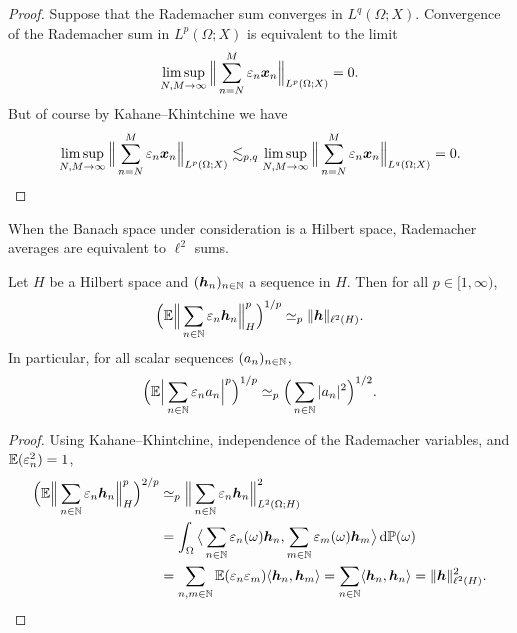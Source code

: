 \begin{proof}
  Suppose that the Rademacher sum converges in $L^q(\Omega;X)$.
  Convergence of the Rademacher sum in $L^p(\Omega;X)$ is equivalent to the limit
  \begin{equation*}
    \limsup_{N,M \to \infty} \Big\| \sum_{n=N}^{M} \varepsilon_{n} \bm{x}_{n} \Big\|_{L^p(\Omega;X)} = 0.
  \end{equation*}
  But of course by Kahane--Khintchine we have
  \begin{equation*}
    \limsup_{N,M \to \infty} \Big\| \sum_{n=N}^{M} \varepsilon_{n} \bm{x}_{n} \Big\|_{L^p(\Omega;X)}
    \lesssim_{p,q} \limsup_{N,M \to \infty} \Big\| \sum_{n=N}^{M} \varepsilon_{n} \bm{x}_{n} \Big\|_{L^q(\Omega;X)} = 0.
  \end{equation*}
\end{proof}

When the Banach space under consideration is a Hilbert space, Rademacher averages are equivalent to $\ell^2$ sums.

\begin{thm}\label{thm:khintchine}
  Let $H$ be a Hilbert space and $(\bm{h}_{n})_{n \in \mathbb{N}}$ a sequence in $H$.
  Then for all $p \in [1,\infty)$,
  \begin{equation*}
    \Big(\mathbb{E} \Big\| \sum_{n \in \mathbb{N}} \varepsilon_{n} \bm{h}_{n} \Big\|_{H}^{p} \Big)^{1/p} \simeq_{p} \|\bm{h}\|_{\ell^2(H)}.
  \end{equation*}
  In particular, for all scalar sequences $(a_{n})_{n \in \mathbb{N}}$,
  \begin{equation*}
    \Big( \mathbb{E} \Big| \sum_{n \in \mathbb{N}} \varepsilon_{n} a_{n} \Big|^{p} \Big)^{1/p}
    \simeq_{p} \Big( \sum_{n \in \mathbb{N}} |a_{n}|^{2} \Big)^{1/2}.
  \end{equation*}
\end{thm}

\begin{proof}
  Using Kahane--Khintchine, independence of the Rademacher variables, and $\mathbb{E}(\varepsilon_{n}^{2}) = 1$,
  \begin{equation*}
    \begin{aligned}
      \Big( \mathbb{E} \Big\| \sum_{n \in \mathbb{N}} \varepsilon_{n} \bm{h}_{n} \Big\|_{H}^{p} \Big)^{2/p}
      &\simeq_{p} \Big\| \sum_{n \in \mathbb{N}} \varepsilon_{n} \bm{h}_{n} \Big\|_{L^2(\Omega;H)}^{2} \\
      &=  \int_{\Omega} \big\langle \sum_{n \in \mathbb{N}} \varepsilon_{n}(\omega) \bm{h}_{n}, \sum_{m \in \mathbb{N}} \varepsilon_{m}(\omega) \bm{h}_{m} \big\rangle \, \mathrm{d} \mathbb{P}(\omega) \\
      & =  \sum_{n,m \in \mathbb{N}} \mathbb{E}(\varepsilon_n \varepsilon_m) \langle \bm{h}_{n}, \bm{h}_{m} \rangle 
      =  \sum_{n \in \mathbb{N}} \langle \bm{h}_{n}, \bm{h}_{n} \rangle  = \|\bm{h}\|_{\ell^2(H)}^{2}.
    \end{aligned}
  \end{equation*}
\end{proof}

